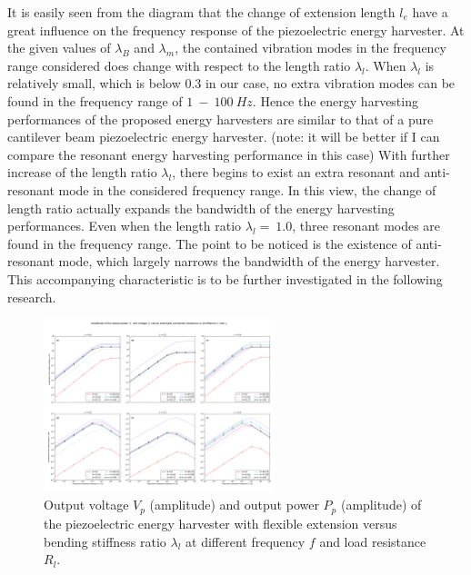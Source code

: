 \documentclass{elsarticle}
\begin{document}
It is easily seen from the diagram that the change of extension length $l_e$ have a great influence on the frequency response of the piezoelectric energy harvester. At the given values of $\lambda_B$ and $\lambda_m$, the contained vibration modes in the frequency range considered does change with respect to
the length ratio $\lambda_l$. When $\lambda_l$ is relatively small, which is below $0.3$ in our case, no extra vibration modes can be found in the frequency range of $1\ - \ 100\ Hz$. Hence the energy harvesting performances of the proposed energy harvesters are similar to that of a pure cantilever beam piezoelectric energy harvester. (note: it will be better if I can compare the resonant energy harvesting performance in this case) With further increase of the length ratio $\lambda_l$, there begins to exist an extra resonant and anti-resonant mode in the considered frequency range. In this view, the change of length ratio actually expands the bandwidth of the energy harvesting performances. Even when the length ratio $\lambda_l =\ 1.0$, three resonant modes are found in the frequency range. The point to be noticed is the existence of anti-resonant mode, which largely narrows the bandwidth of the energy harvester. This accompanying characteristic is to be further investigated in the following research. 


\begin{figure}[!htbp]
    \centering
    \includegraphics[width=0.6\textwidth]{./fig_perf_laml_0p3_0p4_vs_fr_Rl}
    \caption{Output voltage $V_p$ (amplitude) and output power $P_p$ (amplitude) of the piezoelectric energy harvester with flexible extension versus bending stiffness ratio $\lambda_l$ at different frequency $f$ and load resistance $R_l$. }
    \label{fig:fig_perf_laml_0p3_0p4_vs_fr_Rl}
\end{figure}
\end{document}
